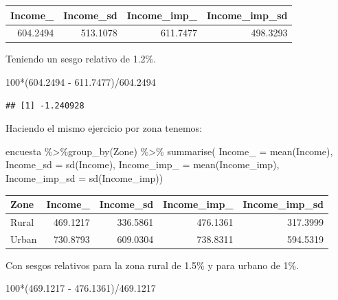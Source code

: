 \documentclass[
  12pt,
]{book}
\newenvironment{Shaded}{\begin{snugshade}}{\end{snugshade}}
\newcommand{\AttributeTok}[1]{\textcolor[rgb]{0.77,0.63,0.00}{#1}}
\newcommand{\DecValTok}[1]{\textcolor[rgb]{0.00,0.00,0.81}{#1}}
\newcommand{\FloatTok}[1]{\textcolor[rgb]{0.00,0.00,0.81}{#1}}
\newcommand{\FunctionTok}[1]{\textcolor[rgb]{0.00,0.00,0.00}{#1}}
\newcommand{\NormalTok}[1]{#1}
\newcommand{\SpecialCharTok}[1]{\textcolor[rgb]{0.00,0.00,0.00}{#1}}
\begin{document}
\begin{tabular}{r|r|r|r}
\hline
Income\_ & Income\_sd & Income\_imp\_ & Income\_imp\_sd\\
\hline
604.2494 & 513.1078 & 611.7477 & 498.3293\\
\hline
\end{tabular}

Teniendo un sesgo relativo de 1.2\%.

\begin{Shaded}
\begin{Highlighting}[]
\DecValTok{100}\SpecialCharTok{*}\NormalTok{(}\FloatTok{604.2494} \SpecialCharTok{{-}} \FloatTok{611.7477}\NormalTok{)}\SpecialCharTok{/}\FloatTok{604.2494}
\end{Highlighting}
\end{Shaded}

\begin{verbatim}
## [1] -1.240928
\end{verbatim}

Haciendo el mismo ejercicio por zona tenemos:

\begin{Shaded}
\begin{Highlighting}[]
\NormalTok{encuesta }\SpecialCharTok{\%\textgreater{}\%}\FunctionTok{group\_by}\NormalTok{(Zone) }\SpecialCharTok{\%\textgreater{}\%}  \FunctionTok{summarise}\NormalTok{(}
  \AttributeTok{Income\_ =} \FunctionTok{mean}\NormalTok{(Income),}
  \AttributeTok{Income\_sd =} \FunctionTok{sd}\NormalTok{(Income),}
  \AttributeTok{Income\_imp\_ =} \FunctionTok{mean}\NormalTok{(Income\_imp),}
  \AttributeTok{Income\_imp\_sd =} \FunctionTok{sd}\NormalTok{(Income\_imp))}
\end{Highlighting}
\end{Shaded}

\begin{tabular}{l|r|r|r|r}
\hline
Zone & Income\_ & Income\_sd & Income\_imp\_ & Income\_imp\_sd\\
\hline
Rural & 469.1217 & 336.5861 & 476.1361 & 317.3999\\
\hline
Urban & 730.8793 & 609.0304 & 738.8311 & 594.5319\\
\hline
\end{tabular}

Con sesgos relativos para la zona rural de 1.5\% y para urbano de 1\%.

\begin{Shaded}
\begin{Highlighting}[]
\DecValTok{100}\SpecialCharTok{*}\NormalTok{(}\FloatTok{469.1217} \SpecialCharTok{{-}} \FloatTok{476.1361}\NormalTok{)}\SpecialCharTok{/}\FloatTok{469.1217}
\end{Highlighting}
\end{Shaded}
\end{document}
